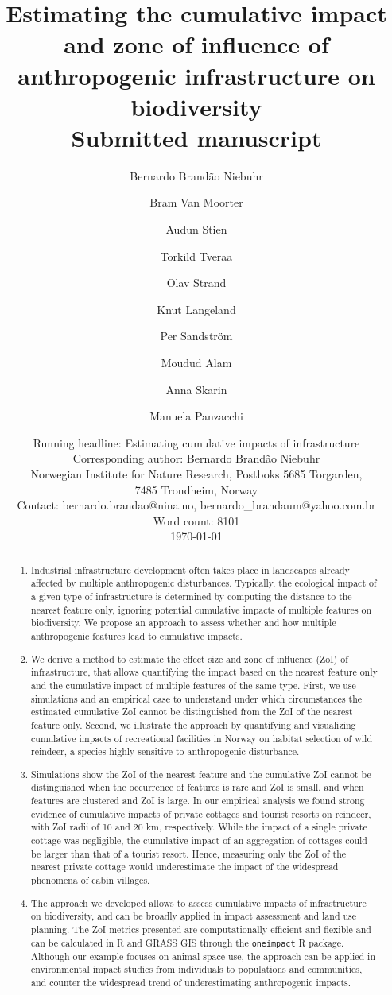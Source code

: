 \documentclass[titlepage]{article}
\title{
Estimating the cumulative impact and zone of influence of anthropogenic infrastructure on biodiversity  \\
{\normalsize Submitted manuscript}
}
\author[1,2,*]{Bernardo Brandão Niebuhr}
\author[1,*]{Bram Van Moorter}
\author[3]{Audun Stien}
\author[4]{Torkild Tveraa}
\author[1]{Olav Strand}
\author[4]{Knut Langeland}
\author[5]{Per Sandström}
\author[6]{Moudud Alam}
\author[2]{Anna Skarin}
\author[1]{Manuela Panzacchi}
\affil[1]{Norwegian Institute for Nature Research (NINA), Trondheim, Norway}
\affil[2]{Swedish University of Agricultural Sciences (SLU), Uppsala, Sweden}
\affil[3]{University of Tromsø, Tromsø, Norway}
\affil[4]{Norwegian Institute for Nature Research (NINA), Tromsø, Norway}
\affil[5]{Swedish University of Agricultural Sciences (SLU), Umeå, Sweden}
\affil[6]{Dalarna University, Falun, Sweden}
\affil[*]{Joint first authorship}
\date{Running headline: Estimating cumulative impacts of infrastructure \\
Corresponding author: Bernardo Brandão Niebuhr \\Norwegian Institute for Nature Research, Postboks 5685 Torgarden, \\7485 Trondheim, Norway \\Contact: bernardo.brandao@nina.no, bernardo\_brandaum@yahoo.com.br \\ Word count: 8101 \\ \today}
\begin{document}
\maketitle

\begin{abstract}

\begin{enumerate}

    \item Industrial infrastructure development often takes place in landscapes already affected by multiple anthropogenic disturbances. Typically, the ecological impact of a given type of infrastructure is determined by computing the distance to the nearest feature only, ignoring potential cumulative impacts of multiple features on biodiversity. We propose an approach to assess whether and how multiple anthropogenic features lead to cumulative impacts.

    \item We derive a method to estimate the effect size and zone of influence (ZoI) of infrastructure, that allows quantifying the impact based on the nearest feature only and the cumulative impact of multiple features of the same type. First, we use simulations and an empirical case to understand under which circumstances the estimated cumulative ZoI cannot be distinguished from the ZoI of the nearest feature only. Second, we illustrate the approach by quantifying and visualizing cumulative impacts of recreational facilities in Norway on habitat selection of wild reindeer, a species highly sensitive to anthropogenic disturbance. 

    \item Simulations show the ZoI of the nearest feature and the cumulative ZoI cannot be distinguished when the occurrence of features is rare and ZoI is small, and when features are clustered and ZoI is large. In our empirical analysis we found strong evidence of cumulative impacts of private cottages and tourist resorts on reindeer, with ZoI radii of 10 and 20 km, respectively. While the impact of a single private cottage was negligible, the cumulative impact of an aggregation of cottages could be larger than that of a tourist resort. Hence, measuring only the ZoI of the nearest private cottage would underestimate the impact of the widespread phenomena of cabin villages.

    \item The approach we developed allows to assess cumulative impacts of infrastructure on biodiversity, and can be broadly applied in impact assessment and land use planning. The ZoI metrics presented are computationally efficient and flexible and can be calculated in R and GRASS GIS through the \verb|oneimpact| R package. Although our example focuses on animal space use, the approach can be applied
    in environmental impact studies from individuals to populations and communities, and counter the widespread trend of underestimating anthropogenic impacts.
\end{enumerate}


\end{abstract}
\end{document}
